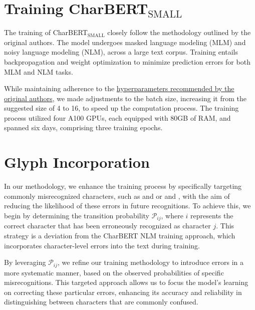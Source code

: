\section{Training CharBERT$_{\text{SMALL}}$}
\label{sec:4_training_charbert_small}
The training of CharBERT$_{\text{SMALL}}$ closely follow the methodology outlined by the original authors. The model undergoes masked language modeling (MLM) and noisy language modeling (NLM), across a large text corpus. Training entails backpropagation and weight optimization to minimize prediction errors for both MLM and NLM tasks.

While maintaining adherence to the \href{https://github.com/mawentao277/CharBERT/blob/main/shell/mlm.sh}{hyperparameters recommended by the original authors}, we made adjustments to the batch size, increasing it from the suggested size of 4 to 16, to speed up the computation process. The training process utilized four A100 GPUs, each equipped with 80GB of RAM, and spanned six days, comprising three training epochs. 
\section{Glyph Incorporation}
\label{sec:3_glyph_incorporation}
In our methodology, we enhance the training process by specifically targeting commonly misrecognized characters, such as  and \say{,} or  and , with the aim of reducing the likelihood of these errors in future recognitions. To achieve this, we begin by determining the transition probability $\mathcal{P}_{ij}$, where $i$ represents the correct character that has been erroneously recognized as character $j$. This strategy is a deviation from the CharBERT NLM training approach, which incorporates character-level errors into the text during training.

By leveraging $\mathcal{P}_{ij}$, we refine our training methodology to introduce errors in a more systematic manner, based on the observed probabilities of specific misrecognitions. This targeted approach allows us to focus the model's learning on correcting these particular errors, enhancing its accuracy and reliability in distinguishing between characters that are commonly confused.

